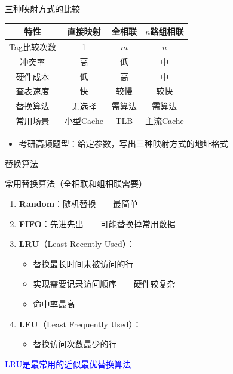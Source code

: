 \documentclass[10pt, aspectratio=169]{beamer}
\begin{document}
\begin{frame}[t]{三种映射方式的比较}
    \begin{center}
        \begin{tabular}{|c|c|c|c|}
            \hline
            \textbf{特性} & \textbf{直接映射} & \textbf{全相联} & \textbf{$n$路组相联} \\
            \hline
            Tag比较次数 & 1 & $m$ & $n$ \\
            \hline
            冲突率 & 高 & 低 & 中 \\
            \hline
            硬件成本 & 低 & 高 & 中 \\
            \hline
            查表速度 & 快 & 较慢 & 较快 \\
            \hline
            替换算法 & 无选择 & 需算法 & 需算法 \\
            \hline
            常用场景 & 小型Cache & TLB & 主流Cache \\
            \hline
        \end{tabular}
    \end{center}
    \vspace{0.5em}
    \begin{itemize}
        \item 考研高频题型：给定参数，写出三种映射方式的地址格式
    \end{itemize}
\end{frame}

\begin{frame}{替换算法}
    \begin{block}{常用替换算法（全相联和组相联需要）}
        \begin{enumerate}
            \item \textbf{Random}：随机替换——最简单
            \item \textbf{FIFO}：先进先出——可能替换掉常用数据
            \item \textbf{LRU}（Least Recently Used）：
            \begin{itemize}
                \item 替换最长时间未被访问的行
                \item 实现需要记录访问顺序——硬件较复杂
                \item 命中率最高
            \end{itemize}
            \item \textbf{LFU}（Least Frequently Used）：
            \begin{itemize}
                \item 替换访问次数最少的行
            \end{itemize}
        \end{enumerate}
    \end{block}
    \vspace{0.3em}
    \begin{center}
        \textcolor{blue}{LRU是最常用的近似最优替换算法}
    \end{center}
\end{frame}
\end{document}
